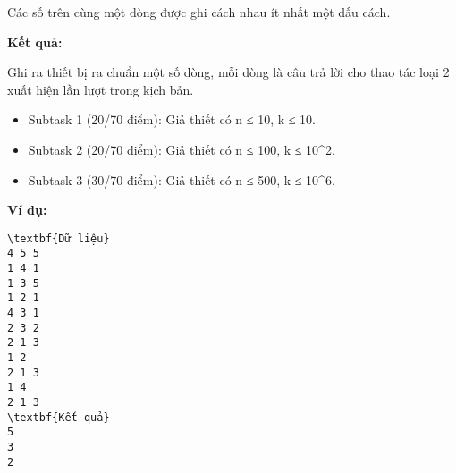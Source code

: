 Các số trên cùng một dòng được ghi cách nhau ít nhất một dấu cách.

\textbf{Kết quả:}

Ghi ra thiết bị ra chuẩn một số dòng, mỗi dòng là câu trả lời cho thao tác loại 2 xuất hiện lần lượt trong kịch bản.
\begin{itemize}
	\item Subtask 1 (20/70 điểm): Giả thiết có n ≤ 10, k ≤ 10.
	\item Subtask 2 (20/70 điểm): Giả thiết có n ≤ 100, k ≤ 10^2.
	\item Subtask 3 (30/70 điểm): Giả thiết có n ≤ 500, k ≤ 10^6.
\end{itemize}

\textbf{Ví dụ:}
\begin{verbatim}
\textbf{Dữ liệu}
4 5 5
1 4 1
1 3 5
1 2 1
4 3 1
2 3 2
2 1 3
1 2
2 1 3
1 4
2 1 3
\textbf{Kết quả}
5
3
2

\end{verbatim}
